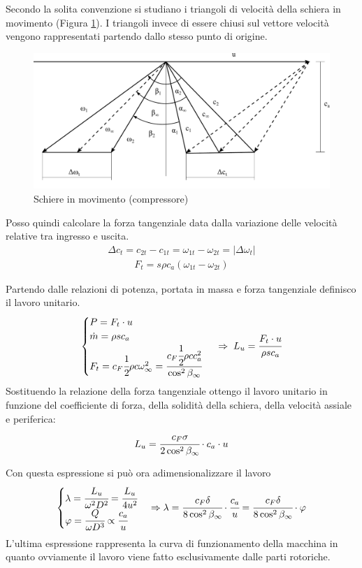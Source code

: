 Secondo la solita convenzione si studiano i triangoli di velocità della schiera in movimento (Figura \ref{fig:SchiereCompr}). I triangoli invece di essere chiusi sul vettore velocità vengono rappresentati partendo dallo stesso punto di origine. 
\begin{figure}
\centering
  \includegraphics[width=\textwidth]{fig/SchiereCompr.pdf}
\caption{Schiere in movimento (compressore)}
\label{fig:SchiereCompr}
\end{figure}
Posso quindi calcolare la forza tangenziale data dalla variazione delle velocità relative tra ingresso e uscita.
\begin{align*}
\Delta c_t = c_{2t} - c_{1t} = \omega_{1t} - \omega_{2t} = |\Delta \omega_t |
\end{align*}
\begin{align*}
F_t = s \rho c_a (\omega_{1t} - \omega_{2t})
\end{align*}

Partendo dalle relazioni di potenza, portata in massa e forza tangenziale definisco il lavoro unitario.
\begin{align*}
\begin{cases}
P=F_t \cdot u\\
\dot{m} = \rho s c_a\\
F_t = c_F \cfrac{1}{2} \rho c \omega_{\infty}^2 = \cfrac{c_F \cfrac{1}{2} \rho c c_a^2}{\cos^2 \beta_{\infty}}
\end{cases} \;
\Rightarrow \;
L_u = \cfrac{F_t \cdot u}{\rho s c_a}
\end{align*}
Sostituendo la relazione della forza tangenziale ottengo il lavoro unitario in funzione del coefficiente di forza, della solidità della schiera, della velocità assiale e periferica:
\begin{align*}
L_u = \cfrac{c_F \sigma}{2 \cos^2 \beta_{\infty}} \cdot c_a \cdot u
\end{align*}

Con questa espressione si può ora adimensionalizzare il lavoro
\begin{align*}
\begin{cases}
\lambda = \cfrac{L_u}{\omega ^2 D^2} = \cfrac{L_u}{4 u^2}\\
\varphi = \cfrac{Q}{\omega D^3} \propto \cfrac{c_a}{u}
\end{cases}
\Rightarrow
\lambda = \cfrac{c_F \delta}{8 \cos^2 \beta_{\infty}} \cdot \cfrac{c_a}{u} = \cfrac{c_F \delta}{8 \cos^2 \beta_{\infty}} \cdot \varphi
\end{align*}
L'ultima espressione rappresenta la curva di funzionamento della macchina in quanto ovviamente il lavoro viene fatto esclusivamente dalle parti rotoriche.

